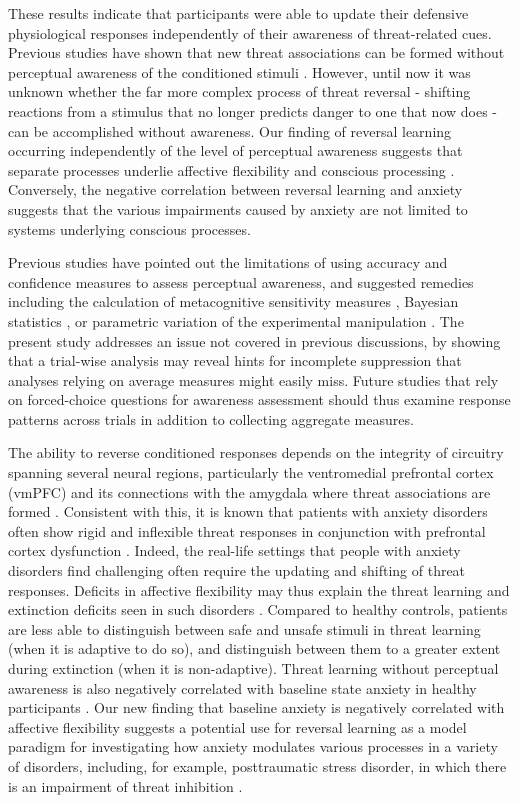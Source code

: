 \documentclass[12pt]{article}
\begin{document}
These results indicate that participants were able to update their
defensive physiological responses independently of their awareness of
threat-related cues. Previous studies have shown that new threat
associations can be formed without perceptual awareness of the
conditioned stimuli
\cite{Manns2002,Wiens2003,Morris1998,Raio2012}. However, until now it
was unknown whether the far more complex process of threat reversal -
shifting reactions from a stimulus that no longer predicts danger to one
that now does - can be accomplished without awareness.  Our finding of
reversal learning occurring independently of the level of perceptual
awareness suggests that separate processes underlie affective
flexibility and conscious processing \cite{Lau2011}. Conversely, the
negative correlation between reversal learning and anxiety suggests that
the various impairments caused by anxiety are not limited to systems
underlying conscious processes.

Previous studies have pointed out the limitations of using accuracy and
confidence measures to assess perceptual awareness, and suggested
remedies including the calculation of metacognitive sensitivity measures
\cite{Fleming2014}, Bayesian statistics \cite{Dienes2015}, or
parametric variation of the experimental manipulation
\cite{Schmidt2015}. The present study addresses an issue not covered
in previous discussions, by showing that a trial-wise analysis may
reveal hints for incomplete suppression that analyses relying on average
measures might easily miss. Future studies that rely on forced-choice
questions for awareness assessment should thus examine response patterns
across trials in addition to collecting aggregate measures. 

The ability to reverse conditioned responses depends on the integrity of
circuitry spanning several neural regions, particularly the ventromedial
prefrontal cortex (vmPFC) and its connections with the
amygdala\cite{Morris2004} where threat associations are formed
\cite{Roy2012}. Consistent with this, it is known that patients with
anxiety disorders often show rigid and inflexible threat responses in
conjunction with prefrontal cortex dysfunction
\cite{Ressler2007,Rauch2006}. Indeed, the real-life settings that
people with anxiety disorders find challenging often require the
updating and shifting of threat responses. Deficits in affective
flexibility may thus explain the threat learning and extinction deficits
seen in such disorders \cite{Duits2015}. Compared to healthy controls,
patients are less able to distinguish between safe and unsafe stimuli in
threat learning (when it is adaptive to do so), and distinguish between
them to a greater extent during extinction (when it is
non-adaptive). Threat learning without perceptual awareness is also
negatively correlated with baseline state anxiety in healthy
participants \cite{Raio2012}. Our new finding that baseline anxiety is
negatively correlated with affective flexibility suggests a potential
use for reversal learning as a model paradigm for investigating how
anxiety modulates various processes in a variety of disorders,
including, for example, posttraumatic stress disorder, in which there is
an impairment of threat inhibition \cite{Jovanovic2011}.
\end{document}
